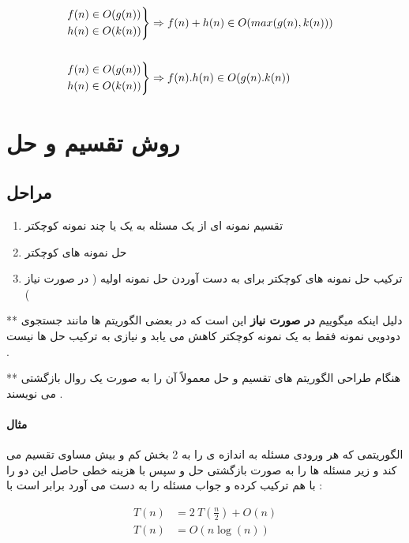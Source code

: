 \documentclass[12pt]{book}
\begin{document}
\begin{align*}
\begin{rcases}
f(n) \in O(g(n)) \\
h(n) \in O(k(n))
\end{rcases} &\Rightarrow
f(n) + h(n) \in O(max(g(n) , k(n)))
\\ \\
\begin{rcases}
f(n) \in O(g(n)) \\
h(n) \in O(k(n))
\end{rcases} &\Rightarrow
f(n) . h(n) \in O(g(n) . k(n))
\end{align*}





\chapter{روش تقسیم و حل}



\section{مراحل}


\begin{enumerate}
	\item تقسیم نمونه ای از یک مسئله به یک یا چند نمونه کوچکتر
	\item حل نمونه های کوچکتر
	\item ترکیب حل نمونه های کوچکتر برای به دست آوردن حل نمونه اولیه ( در صورت نیاز )
\end{enumerate}


\noindent
** دلیل اینکه میگوییم 
\textbf{در صورت نیاز}
این است که در بعضی الگوریتم ها مانند جستجوی دودویی نمونه فقط به یک نمونه کوچکتر کاهش می یابد و نیازی به ترکیب حل ها نیست .

\noindent
** هنگام طراحی الگوریتم های تقسیم و حل معمولاً آن را به صورت یک روال بازگشتی می نویسند .


\subsubsection{مثال}

\noindent
الگوریتمی که هر ورودی مسئله به اندازه ی
را به 2 بخش کم و بیش مساوی تقسیم می کند و زیر مسئله ها را به صورت بازگشتی حل و سپس با هزینه خطی حاصل این دو را با هم ترکیب کرده و جواب مسئله را به دست می آورد برابر است با :

\begin{align*}
T(n) &= 2 \: T(\frac{n}{2}) + O(n) \\
T(n) &= O(n\log{(n)})
\end{align*}
\end{document}
